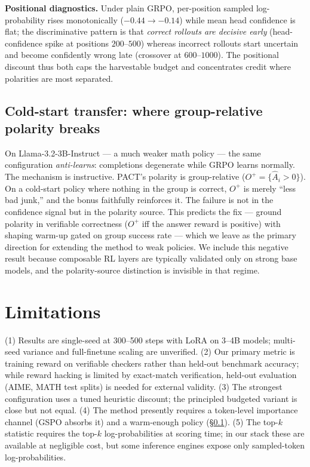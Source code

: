 \documentclass{article} %
\theoremstyle{plain}
\theoremstyle{definition}
\theoremstyle{remark}
\newcommand{\method}{PACT}
\begin{document}
\textbf{Positional diagnostics.} Under plain GRPO, per-position sampled log-probability rises monotonically ($-0.44\to-0.14$) while mean head confidence is flat; the discriminative pattern is that \emph{correct rollouts are decisive early} (head-confidence spike at positions $200$--$500$) whereas incorrect rollouts start uncertain and become confidently wrong late (crossover at $600$--$1000$). The positional discount thus both caps the harvestable budget and concentrates credit where polarities are most separated.

\subsection{Cold-start transfer: where group-relative polarity breaks}
\label{sec:llama}

On Llama-3.2-3B-Instruct --- a much weaker math policy --- the same configuration \emph{anti-learns}: completions degenerate while GRPO learns normally. The mechanism is instructive. \method{}'s polarity is group-relative ($O^+ = \{\hat A_i > 0\}$). On a cold-start policy where nothing in the group is correct, $O^+$ is merely ``less bad junk,'' and the bonus faithfully reinforces it. The failure is not in the confidence signal but in the polarity source. This predicts the fix --- ground polarity in verifiable correctness ($O^+$ iff the answer reward is positive) with shaping warm-up gated on group success rate --- which we leave as the primary direction for extending the method to weak policies. We include this negative result because composable RL layers are typically validated only on strong base models, and the polarity-source distinction is invisible in that regime.

\section{Limitations}
\label{sec:limitations}

(1) Results are single-seed at 300--500 steps with LoRA on 3--4B models; multi-seed variance and full-finetune scaling are unverified. (2) Our primary metric is training reward on verifiable checkers rather than held-out benchmark accuracy; while reward hacking is limited by exact-match verification, held-out evaluation (AIME, MATH test splits) is needed for external validity. (3) The strongest configuration uses a tuned heuristic discount; the principled budgeted variant is close but not equal. (4) The method presently requires a token-level importance channel (GSPO absorbs it) and a warm-enough policy (\S\ref{sec:llama}). (5) The top-$k$ statistic requires the top-$k$ log-probabilities at scoring time; in our stack these are available at negligible cost, but some inference engines expose only sampled-token log-probabilities.
\end{document}
